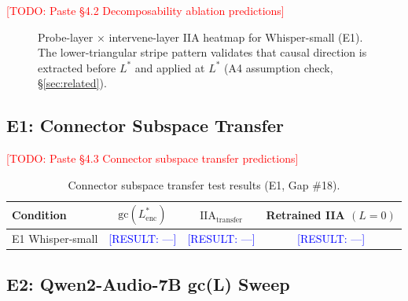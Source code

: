 \documentclass{article}
\newcommand{\gc}{\text{gc}}
\newcommand{\iia}{\text{IIA}}
\newcommand{\Lstar}{L^*}
\newcommand{\todo}[1]{\textcolor{red}{[TODO: #1]}}
\newcommand{\result}[1]{\textcolor{blue}{[RESULT: #1]}}
\begin{document}
\todo{Paste §4.2 Decomposability ablation predictions}

\begin{figure}[h]
  \centering
  \caption{Probe-layer × intervene-layer IIA heatmap for Whisper-small (E1).
    The lower-triangular stripe pattern validates that causal direction is extracted
    before $\Lstar$ and applied at $\Lstar$ (A4 assumption check, \S\ref{sec:related}).}
  \label{fig:e1_heatmap}
\end{figure}

\subsection{E1: Connector Subspace Transfer}
\label{sec:e1_connector}


\todo{Paste §4.3 Connector subspace transfer predictions}

\begin{table}[h]
  \caption{Connector subspace transfer test results (E1, Gap \#18).}
  \label{tab:connector}
  \centering
  \begin{tabular}{lccc}
    \toprule
    \textbf{Condition} & $\gc(L^*_\text{enc})$ & $\iia_\text{transfer}$ & Retrained IIA $(L=0)$ \\
    \midrule
    E1 Whisper-small & \result{---} & \result{---} & \result{---} \\
    \bottomrule
  \end{tabular}
\end{table}

\subsection{E2: Qwen2-Audio-7B gc(L) Sweep}
\label{sec:e2}
\end{document}
